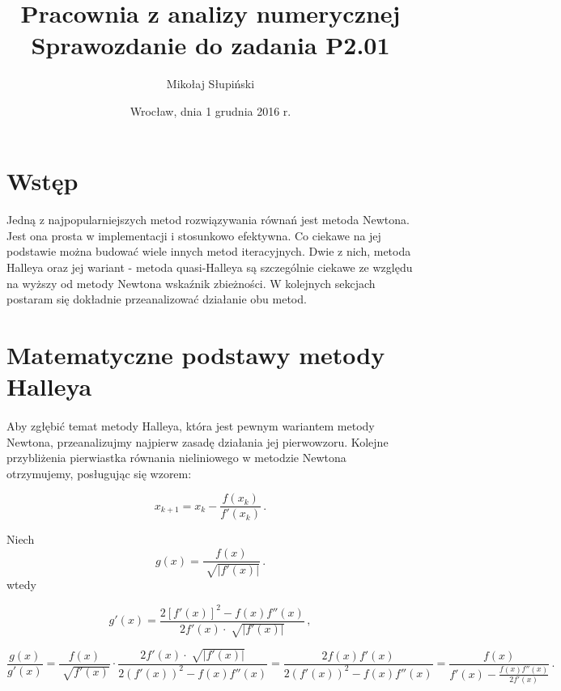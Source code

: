 \documentclass{article}
\title{Pracownia z analizy numerycznej \\ Sprawozdanie do zadania P2.01}
\author{Mikołaj Słupiński}
\date{Wrocław, dnia 1 grudnia 2016 r.}
\begin{document}
  \maketitle
  \section{Wstęp}
    \paragraph{}Jedną z najpopularniejszych metod rozwiązywania równań jest metoda
    Newtona. Jest ona prosta w implementacji i stosunkowo efektywna. Co ciekawe na
    jej podstawie można budować wiele innych metod iteracyjnych. Dwie z nich,
    metoda Halleya oraz jej wariant - metoda quasi-Halleya są szczególnie ciekawe
    ze względu na wyższy od metody Newtona wskaźnik zbieżności. W kolejnych
    sekcjach postaram się dokładnie przeanalizować działanie obu metod.

  \section{Matematyczne podstawy metody Halleya}

    \paragraph{} Aby zgłębić temat metody Halleya, która jest pewnym wariantem
    metody Newtona, przeanalizujmy najpierw zasadę działania jej pierwowzoru.
    Kolejne przybliżenia pierwiastka równania nieliniowego w metodzie Newtona
    otrzymujemy, posługując się wzorem:

    \begin{equation}\label{eq:newton}
      x_{k+1} = x_{k} - \frac{f(x_{k})}{f'(x_{k})} \,.
    \end{equation}

    Niech
    \begin{equation*}
      g(x) = \frac{f(x)}{\sqrt[]{|f'(x)|}}\,.
    \end{equation*}
    wtedy

    \begin{equation*}
      g'(x) = \frac{2[f'(x)]^2 - f(x)f''(x)}{2f'(x) \cdot \sqrt[]{|f'(x)|}}\,,
    \end{equation*}

    \begin{equation*}
      \frac{g(x)}{g'(x)}
      = \frac{f(x)}{\sqrt[]{f'(x)}} \cdot \frac{2f'(x) \cdot \sqrt[]{|f'(x)|}}{2(f'(x))^2 - f(x)f''(x)}
      = \frac{2f(x)f'(x)}{2(f'(x))^2 - f(x)f''(x)}
      = \frac{f(x)}{f'(x) - \frac{f(x)f''(x)}{2f'(x)}}\,.
    \end{equation*}
\end{document}
